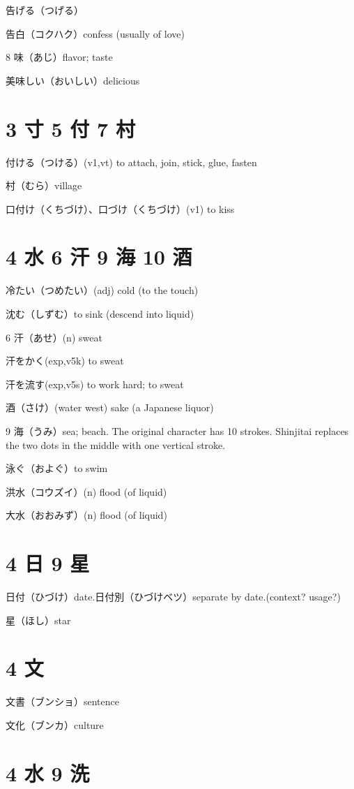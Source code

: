 告げる（つげる）

告白（コクハク）confess (usually of love)

8 味（あじ）flavor; taste

美味しい（おいしい）delicious

\section{3 寸 5 付 7 村}

付ける（つける）(v1,vt) to attach, join, stick, glue, fasten

村（むら）village

口付け（くちづけ）、口づけ（くちづけ）(v1) to kiss

\section{4 水 6 汗 9 海 10 酒}

冷たい（つめたい）(adj) cold (to the touch)

沈む（しずむ）to sink (descend into liquid)

6 汗（あせ）(n) sweat

汗をかく(exp,v5k) to sweat

汗を流す(exp,v5s) to work hard; to sweat

酒（さけ）(water west) sake (a Japanese liquor)

9 海（うみ）sea; beach.
The original character has 10 strokes.
Shinjitai replaces the two dots in the middle
with one vertical stroke.

泳ぐ（およぐ）to swim

洪水（コウズイ）(n) flood (of liquid)

大水（おおみず）(n) flood (of liquid)

\section{4 日 9 星}

日付（ひづけ）date.日付別（ひづけベツ）separate by date.(context? usage?)

星（ほし）star

\section{4 文}

文書（ブンショ）sentence

文化（ブンカ）culture

\section{4 水 9 洗}

